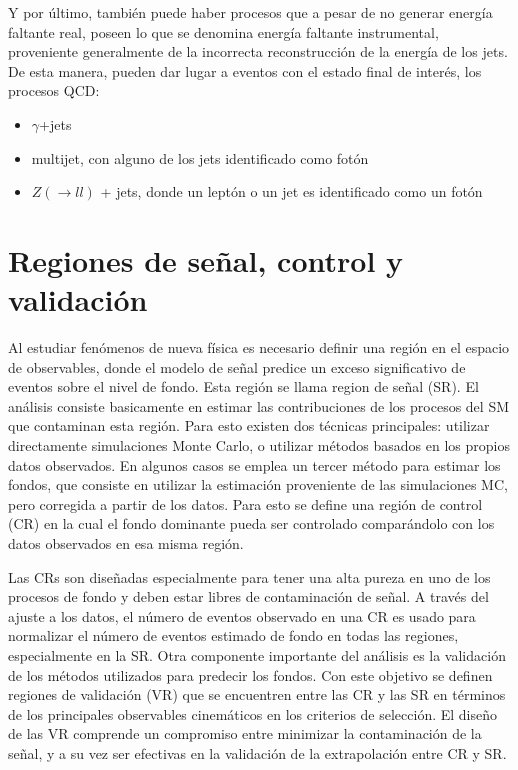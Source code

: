 Y por último, también puede haber procesos que a pesar de no generar energía faltante real, poseen lo que se denomina energía faltante instrumental, proveniente generalmente de la incorrecta reconstrucción de la energía de los jets. De esta manera, pueden dar lugar a eventos con el estado final de interés, los procesos QCD:

\begin{itemize}

	\item $\gamma$+jets

	\item multijet, con alguno de los jets identificado como fotón

	\item $Z(\rightarrow ll)$ + jets, donde un leptón o un jet es identificado como un fotón

\end{itemize}



\section{Regiones de señal, control y validación}

Al estudiar fenómenos de nueva física es necesario definir una región en el espacio de observables, donde el modelo de señal predice un exceso significativo de eventos sobre el nivel de fondo. Esta región se llama region de señal (SR). El análisis consiste basicamente en estimar las contribuciones de los procesos del SM que contaminan esta región. Para esto existen dos técnicas principales: utilizar directamente simulaciones Monte Carlo, o utilizar métodos basados en los propios datos observados. En algunos casos se emplea un tercer método para estimar los fondos, que consiste en utilizar la estimación proveniente de las simulaciones MC, pero corregida a partir de los datos. Para esto se define una región de control (CR) en la cual el fondo dominante pueda ser controlado comparándolo con los
datos observados en esa misma región. 

Las CRs son diseñadas especialmente para tener una alta pureza en uno de los procesos de fondo y deben estar libres de contaminación de señal. A través del ajuste a los datos, el número de eventos observado en una CR es usado para normalizar el número de eventos estimado de fondo en todas las regiones, especialmente en la SR. Otra componente importante del análisis es la validación de los métodos utilizados para predecir los fondos. Con este objetivo se definen regiones de validación (VR) que se encuentren entre las CR y las SR en términos de los principales observables cinemáticos en los criterios de selección. El diseño de las VR comprende un compromiso entre minimizar la contaminación de la señal, y a su vez ser efectivas en la validación de la extrapolación entre CR y SR. 